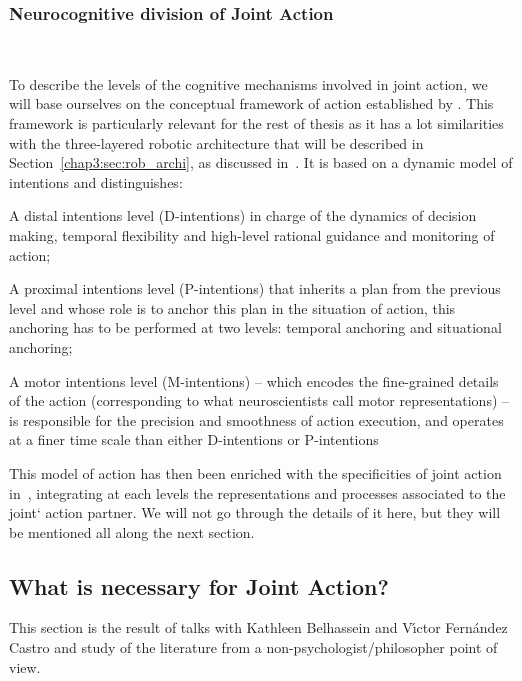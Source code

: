\documentclass[a4paper,11pt,twoside]{StyleThese}
\begin{document}
\subsubsection{Neurocognitive division of Joint Action}~\label{chap1:subsubsec:neuro_seg}

To describe the levels of the cognitive mechanisms involved in joint action, we will base ourselves on the conceptual framework of action established by \cite{pacherie_2008_phenomenology}. This framework is particularly relevant for the rest of thesis as it has a lot similarities with the three-layered robotic architecture that will be described in Section~\ref{chap3:sec:rob_archi}, as discussed in~\citep{clodic_2017_key}. It is based on a dynamic model of intentions and distinguishes:

\begin{bulletList}
	\item A distal intentions level (D-intentions) in charge of the dynamics of decision making, temporal flexibility and high-level rational guidance and monitoring of action;
	\item A proximal intentions level (P-intentions) that inherits a plan from the previous level and whose role is to anchor this plan in the situation of action, this anchoring has to be performed at two levels: temporal anchoring and situational anchoring;
	\item A motor intentions level (M-intentions) -- which encodes the fine-grained details of the action (corresponding to what neuroscientists call motor representations) -- is responsible for the precision and smoothness of action execution, and operates at a finer time scale than either D-intentions or P-intentions
\end{bulletList}

This model of action has then been enriched with the specificities of joint action in~\citep{pacherie_2012_agency}, integrating at each levels the representations and processes associated to the joint` action partner. We will not go through the details of it here, but they will be mentioned all along the next section.

\subsection{What is necessary for Joint Action?}\label{chap1:subsec:necess_ja}

This section is the result of talks with Kathleen Belhassein and V{\'\i}ctor Fern{\'a}ndez Castro and study of the literature from a non-psychologist/philosopher point of view.
\end{document}
